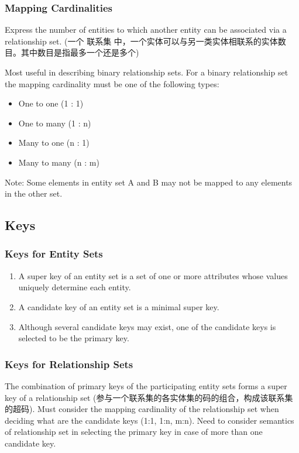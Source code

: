 \subsubsection{Mapping Cardinalities}
Express the number of entities to which another entity can be associated via a relationship set. (一个 联系集 中，一个实体可以与另一类实体相联系的实体数目。其中数目是指最多一个还是多个)

Most useful in describing binary relationship sets. For a binary relationship set the mapping cardinality must be one of the following types:
\begin{itemize}\small
    \item One to one (1 : 1)
    \item One to many (1 : n)
    \item Many to one (n : 1)
    \item Many to many (n : m)
\end{itemize}

Note: Some elements in entity set A and B may not be mapped to any elements in the other set.


\subsection{Keys}
\subsubsection{Keys for Entity Sets}
\begin{enumerate}
    \item A super key of an entity set is a set of one or more attributes whose values uniquely determine each entity. 
    \item A candidate key of an entity set is a minimal super key. 
    \item Although several candidate keys may exist, one of the candidate keys is selected to be the primary key.
\end{enumerate}

\subsubsection{Keys for Relationship Sets}
The combination of primary keys of the participating entity sets forms a super key of a relationship set (参与一个联系集的各实体集的码的组合，构成该联系集的超码). Must consider the mapping cardinality of the relationship set when deciding what are the candidate keys (1:1, 1:n, m:n). Need to consider semantics of relationship set in selecting the primary key in case of more than one candidate key. 

